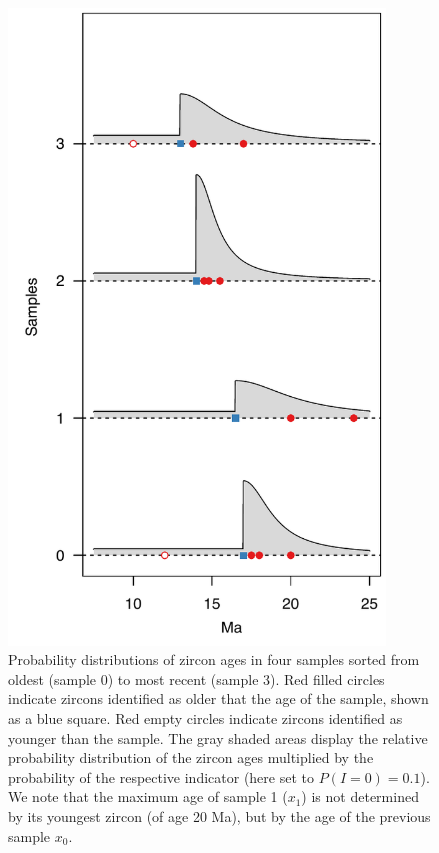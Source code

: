 \documentclass[12pt,letterpaper]{article}
\begin{document}
\begin{figure}[h!]
\centering
\includegraphics[width=100mm]{figs/SampleProb.pdf}
\caption{Probability distributions of zircon ages in four samples sorted from oldest (sample 0) to most recent (sample 3). Red filled circles indicate zircons  identified as older that the age of the sample, shown as a blue square. Red empty circles indicate zircons identified as younger than the sample. The gray shaded areas display the relative probability distribution of the zircon ages multiplied by the probability of the respective indicator (here set to $P(I = 0) = 0.1$). We note that the maximum age of sample 1 ($x_1$) is not determined by its youngest zircon (of age 20 Ma), but by the age of the previous sample $x_0$. }
\label{f_sample_prob}
\end{figure}

\clearpage
\newpage
\end{document}
